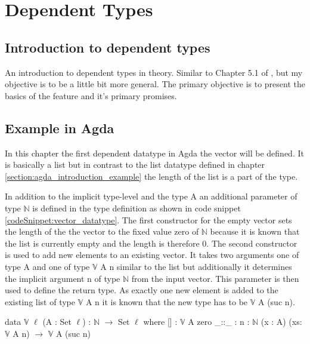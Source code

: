 \section{Dependent Types}
\subsection{Introduction to dependent types}
An introduction to dependent types in theory. Similar to Chapter 5.1 of \cite{10.1145/2841316}, but my objective is to be a little bit more general.
The primary objective is to present the basics of the feature and it's primary promises.

\subsection{Example in Agda}
In this chapter the first dependent datatype in Agda the vector will be defined.
It is basically a list but in contrast to the list datatype defined in chapter \ref{section:agda_introduction_example} the length of the list is a part of the type.

In addition to the implicit type-level and the type A an additional parameter of type $\mathbb{N}$ is defined in the type definition as shown in code snippet \ref{codeSnippet:vector_datatype}.
The first constructor for the empty vector sets the length of the the vector to the fixed value zero of $\mathbb{N}$ because it is known that the list is currently empty and the length is therefore 0.
The second constructor is used to add new elements to an existing vector. It takes two arguments one of type A and one of type $\mathbb{V}$ A n similar to the list but additionally it determines the implicit argument n of type $\mathbb{N}$ from the input vector.
This parameter is then used to define the return type. As exactly one new element is added to the existing list of type $\mathbb{V}$ A n it is known that the new type has to be $\mathbb{V}$ A (suc n).

\begin{codesnippet}[mathescape=true, caption={Definition of the vector datatype in Agda}, label={codeSnippet:vector_datatype}]
data $\mathbb{V}$ {$\ell$} (A : Set $\ell$) : $\mathbb{N}$ $\rightarrow$ Set $\ell$ where
  [] : $\mathbb{V}$ A zero
  _::_ : {n : $\mathbb{N}$} (x : A) (xs: $\mathbb{V}$ A n) $\rightarrow$
         $\mathbb{V}$ A (suc n)
\end{codesnippet}

